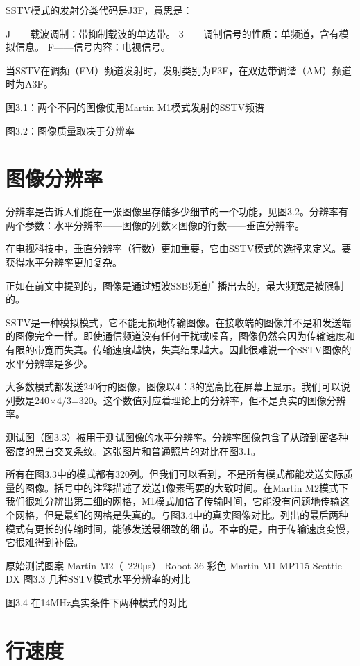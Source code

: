 SSTV模式的发射分类代码是J3F，意思是：

J——载波调制：带抑制载波的单边带。
3——调制信号的性质：单频道，含有模拟信息。
F——信号内容：电视信号。

当SSTV在调频（FM）频道发射时，发射类别为F3F，在双边带调谐（AM）频道时为A3F。

图3.1：两个不同的图像使用Martin M1模式发射的SSTV频谱

图3.2：图像质量取决于分辨率


\section{图像分辨率}

分辨率是告诉人们能在一张图像里存储多少细节的一个功能，见图3.2。分辨率有两个参数：水平分辨率——图像的列数×图像的行数——垂直分辨率。

在电视科技中，垂直分辨率（行数）更加重要，它由SSTV模式的选择来定义。要获得水平分辨率更加复杂。

正如在前文中提到的，图像是通过短波SSB频道广播出去的，最大频宽是被限制的。

SSTV是一种模拟模式，它不能无损地传输图像。在接收端的图像并不是和发送端的图像完全一样。即使通信频道没有任何干扰或噪音，图像仍然会因为传输速度和有限的带宽而失真。传输速度越快，失真结果越大。因此很难说一个SSTV图像的水平分辨率是多少。

大多数模式都发送240行的图像，图像以4：3的宽高比在屏幕上显示。我们可以说列数是240×4/3=320。这个数值对应着理论上的分辨率，但不是真实的图像分辨率。

测试图（图3.3）被用于测试图像的水平分辨率。分辨率图像包含了从疏到密各种密度的黑白交叉条纹。这张图片和普通照片的对比在图3.1。

所有在图3.3中的模式都有320列。但我们可以看到，不是所有模式都能发送实际质量的图像。括号中的注释描述了发送1像素需要的大致时间。在Martin M2模式下我们很难分辨出第二细的网格，M1模式加倍了传输时间，它能没有问题地传输这个网格，但是最细的网格是失真的。与图3.4中的真实图像对比。列出的最后两种模式有更长的传输时间，能够发送最细致的细节。不幸的是，由于传输速度变慢，它很难得到补偿。

原始测试图案
Martin M2（~220μs）
Robot 36 彩色
Martin M1
MP115
Scottie DX
图3.3 几种SSTV模式水平分辨率的对比

图3.4 在14MHz真实条件下两种模式的对比

\section{行速度}

